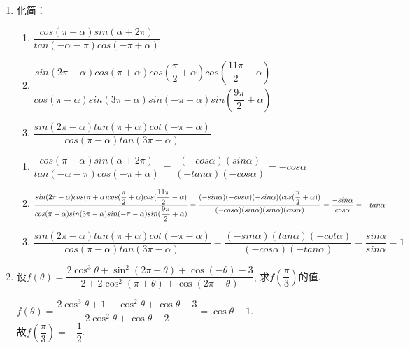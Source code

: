 \begin{enumerate}
    \item 化简：
    \begin{enumerate}
        \item $\dfrac{cos(\pi+\alpha)sin(\alpha+2\pi)}{tan(-\alpha-\pi)cos(-\pi+\alpha)}$ 
        \item $\dfrac{sin(2\pi-\alpha)cos(\pi+\alpha)cos(\dfrac{\pi}{2}+\alpha)cos(\dfrac{11\pi}{2}-\alpha)}{cos(\pi-\alpha)sin(3\pi-\alpha)sin(-\pi-\alpha)sin(\dfrac{9\pi}{2}+\alpha)}$
        \item $\dfrac{sin(2\pi-\alpha)tan(\pi+\alpha)cot(-\pi-\alpha)}{cos(\pi-\alpha)tan(3\pi-\alpha)}$
    \end{enumerate}
    \begin{jieda}
        \begin{enumerate}
            \item $\dfrac{cos(\pi+\alpha)sin(\alpha+2\pi)}{tan(-\alpha-\pi)cos(-\pi+\alpha)}$ = $\dfrac{(-cos\alpha)(sin\alpha)}{(-tan\alpha)(-cos\alpha)} = -cos\alpha$
            \item $\dfrac{sin(2\pi-\alpha)cos(\pi+\alpha)cos(\dfrac{\pi}{2}+\alpha)cos(\dfrac{11\pi}{2}-\alpha)}{cos(\pi-\alpha)sin(3\pi-\alpha)sin(-\pi-\alpha)sin(\dfrac{9\pi}{2}+\alpha)} \\ = \dfrac{(-sin\alpha)(-cos\alpha)(-sin\alpha)(cos(\dfrac{\pi}{2}+\alpha))}{(-cos\alpha)(sin\alpha)(sin\alpha)(cos\alpha)} = \dfrac{-sin\alpha}{cos\alpha} = -tan\alpha$
            \item $\dfrac{sin(2\pi-\alpha)tan(\pi+\alpha)cot(-\pi-\alpha)}{cos(\pi-\alpha)tan(3\pi-\alpha)} = \dfrac{(-sin\alpha)(tan\alpha)(-cot\alpha)}{(-cos\alpha)(-tan\alpha)} = \dfrac{sin\alpha}{sin\alpha} = 1$
        \end{enumerate}
    \end{jieda}

    \item 设$f\left(\theta\right)=\dfrac{2\cos^3\theta+\sin^2\left(2\pi-\theta\right)+\cos\left(-\theta\right)-3}{2+2\cos^2\left(\pi+\theta\right)+\cos\left(2\pi-\theta\right)}$, 求$f\left(\dfrac{\pi}{3}\right)$的值. 
    \begin{jieda}
    $f\left(\theta\right)=\dfrac{2\cos^3\theta+1-\cos^2\theta+\cos\theta-3}{2\cos^2\theta+\cos\theta-2}=\cos\theta-1$. \\
    故$f\left(\dfrac{\pi}{3}\right)=-\dfrac{1}{2}$. 
    \end{jieda}
    

\end{enumerate}
